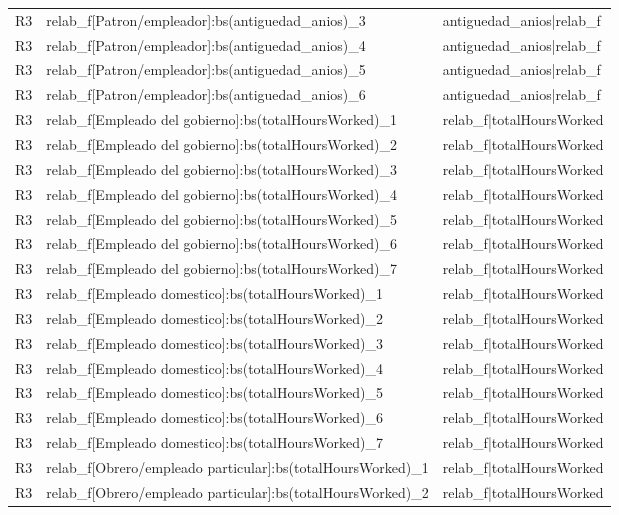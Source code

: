 \begin{longtable}{lll}
R3 & relab\_f[Patron/empleador]:bs(antiguedad\_anios)\_3 & antiguedad\_anios|relab\_f \\
R3 & relab\_f[Patron/empleador]:bs(antiguedad\_anios)\_4 & antiguedad\_anios|relab\_f \\
R3 & relab\_f[Patron/empleador]:bs(antiguedad\_anios)\_5 & antiguedad\_anios|relab\_f \\
R3 & relab\_f[Patron/empleador]:bs(antiguedad\_anios)\_6 & antiguedad\_anios|relab\_f \\
R3 & relab\_f[Empleado del gobierno]:bs(totalHoursWorked)\_1 & relab\_f|totalHoursWorked \\
R3 & relab\_f[Empleado del gobierno]:bs(totalHoursWorked)\_2 & relab\_f|totalHoursWorked \\
R3 & relab\_f[Empleado del gobierno]:bs(totalHoursWorked)\_3 & relab\_f|totalHoursWorked \\
R3 & relab\_f[Empleado del gobierno]:bs(totalHoursWorked)\_4 & relab\_f|totalHoursWorked \\
R3 & relab\_f[Empleado del gobierno]:bs(totalHoursWorked)\_5 & relab\_f|totalHoursWorked \\
R3 & relab\_f[Empleado del gobierno]:bs(totalHoursWorked)\_6 & relab\_f|totalHoursWorked \\
R3 & relab\_f[Empleado del gobierno]:bs(totalHoursWorked)\_7 & relab\_f|totalHoursWorked \\
R3 & relab\_f[Empleado domestico]:bs(totalHoursWorked)\_1 & relab\_f|totalHoursWorked \\
R3 & relab\_f[Empleado domestico]:bs(totalHoursWorked)\_2 & relab\_f|totalHoursWorked \\
R3 & relab\_f[Empleado domestico]:bs(totalHoursWorked)\_3 & relab\_f|totalHoursWorked \\
R3 & relab\_f[Empleado domestico]:bs(totalHoursWorked)\_4 & relab\_f|totalHoursWorked \\
R3 & relab\_f[Empleado domestico]:bs(totalHoursWorked)\_5 & relab\_f|totalHoursWorked \\
R3 & relab\_f[Empleado domestico]:bs(totalHoursWorked)\_6 & relab\_f|totalHoursWorked \\
R3 & relab\_f[Empleado domestico]:bs(totalHoursWorked)\_7 & relab\_f|totalHoursWorked \\
R3 & relab\_f[Obrero/empleado particular]:bs(totalHoursWorked)\_1 & relab\_f|totalHoursWorked \\
R3 & relab\_f[Obrero/empleado particular]:bs(totalHoursWorked)\_2 & relab\_f|totalHoursWorked \\

\end{longtable}

